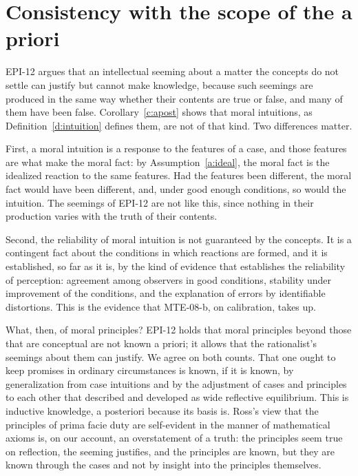 \documentclass{situationist-preprint}
\begin{document}
\section{Consistency with the scope of the a priori}\label{s:principles}

EPI-12 argues that an intellectual seeming about a matter the concepts do not settle can justify but cannot make knowledge, because such seemings are produced in the same way whether their contents are true or false, and many of them have been false. Corollary~\ref{c:apost} shows that moral intuitions, as Definition~\ref{d:intuition} defines them, are not of that kind. Two differences matter.

First, a moral intuition is a response to the features of a case, and those features are what make the moral fact: by Assumption~\ref{a:ideal}, the moral fact is the idealized reaction to the same features. Had the features been different, the moral fact would have been different, and, under good enough conditions, so would the intuition. The seemings of EPI-12 are not like this, since nothing in their production varies with the truth of their contents.

Second, the reliability of moral intuition is not guaranteed by the concepts. It is a contingent fact about the conditions in which reactions are formed, and it is established, so far as it is, by the kind of evidence that establishes the reliability of perception: agreement among observers in good conditions, stability under improvement of the conditions, and the explanation of errors by identifiable distortions. This is the evidence that MTE-08-b, on calibration, takes up.

What, then, of moral principles? EPI-12 holds that moral principles beyond those that are conceptual are not known a priori; it allows that the rationalist's seemings about them can justify. We agree on both counts. That one ought to keep promises in ordinary circumstances is known, if it is known, by generalization from case intuitions and by the adjustment of cases and principles to each other that \citet{Rawls1951} described and \citet{Daniels1979} developed as wide reflective equilibrium. This is inductive knowledge, a posteriori because its basis is. Ross's view that the principles of prima facie duty are self-evident in the manner of mathematical axioms is, on our account, an overstatement of a truth: the principles seem true on reflection, the seeming justifies, and the principles are known, but they are known through the cases and not by insight into the principles themselves.
\end{document}
